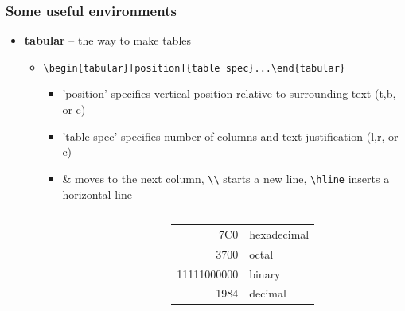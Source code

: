 \documentclass[11pt]{beamer}
\begin{document}
\begin{frame}[fragile]\frametitle{Some useful environments}
\begin{itemize}
	\item<1-> \textbf{tabular} -- the way to make tables
		\begin{itemize}
			\item {\footnotesize \verb+\begin{tabular}[position]{table spec}...\end{tabular}+}
			\begin{itemize}
				\item 'position' specifies vertical position relative to surrounding text (t,b, or c)
				\item 'table spec' specifies number of columns and text justification (l,r, or c)
				\item \& moves to the next column, \verb+\\+ starts a new line, \verb+\hline+ inserts a horizontal line \\
				\begin{columns}
				\begin{column}{5cm}
				\end{column}
				\begin{column}{5cm}
					\begin{tabular}{|r|l|}
					\hline
					7C0 & hexadecimal \\
					3700 & octal \\ \cline{2-2}
					11111000000 & binary \\
					\hline \hline
					1984 & decimal \\
					\hline
					\end{tabular}
				\end{column}
				\end{columns}
			\end{itemize}
		\end{itemize}
\end{itemize}
\end{frame}

%
%
\end{document}
